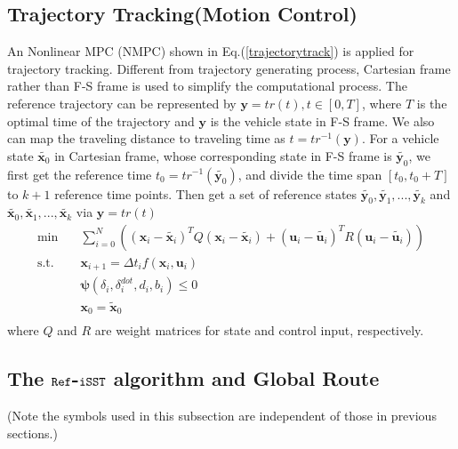 \documentclass[conference, onecolumn]{IEEEtran}
\begin{document}
\subsection{Trajectory Tracking(Motion Control)}
An Nonlinear MPC (NMPC) shown in Eq.(\ref{trajectorytrack}) is applied for trajectory tracking. Different from trajectory generating process, Cartesian frame rather than F-S frame is used to simplify the computational process. The reference trajectory can be represented by $\boldsymbol{y}=tr(t),t \in [0,T]$, where $T$ is the optimal time of the trajectory and $\boldsymbol{y}$ is the vehicle state in F-S frame. We also can map the traveling distance to traveling time as $t=tr^{-1}(\boldsymbol{y})$. For a vehicle state $\widetilde{\boldsymbol{x}_0}$ in Cartesian frame, whose corresponding state in F-S frame is $\widetilde{\boldsymbol{y}_0}$, we first get the reference time $t_0=tr^{-1}(\widetilde{\boldsymbol{y}_0})$, and divide the time span $[t_0,t_0+T]$ to $k+1$ reference time points. Then get a set of reference states $\widetilde{\boldsymbol{y}_0},\widetilde{\boldsymbol{y}_1},...,\widetilde{\boldsymbol{y}_k}$ and $\widetilde{\boldsymbol{x}_0},\widetilde{\boldsymbol{x}_1},...,\widetilde{\boldsymbol{x}_k}$ via $\boldsymbol{y}=tr(t)$
\begin{equation}
	\label{trajectorytrack}
	\begin{aligned}
		\min \quad & \sum_{i = 0}^{N}\left((\boldsymbol{x}_i-\widetilde{\boldsymbol{x}_i})^TQ(\boldsymbol{x}_i-\widetilde{\boldsymbol{x}_i}) + (\boldsymbol{u}_i-\widetilde{\boldsymbol{u}_i})^TR(\boldsymbol{u}_i-\widetilde{\boldsymbol{u}_i})\right)\\
		\textrm{s.t.} \quad & \boldsymbol{x}_{i+1}=\varDelta t_i f(\boldsymbol{x}_i,\boldsymbol{u}_i)\\
		\quad &  \boldsymbol{\psi}(\delta_i,\delta^{dot}_i,d_i,b_i)\leqslant 0 \\
		\quad & \boldsymbol{x}_0=\widetilde{\boldsymbol{x}}_0
		\\
	\end{aligned}
\end{equation}
where $Q$ and $R$ are weight matrices for state and control input, respectively.

\subsection{The $\tt Ref$-$\tt iSST$ algorithm and Global Route}
(Note the symbols used in this subsection are independent of those in previous sections.)
\end{document}
